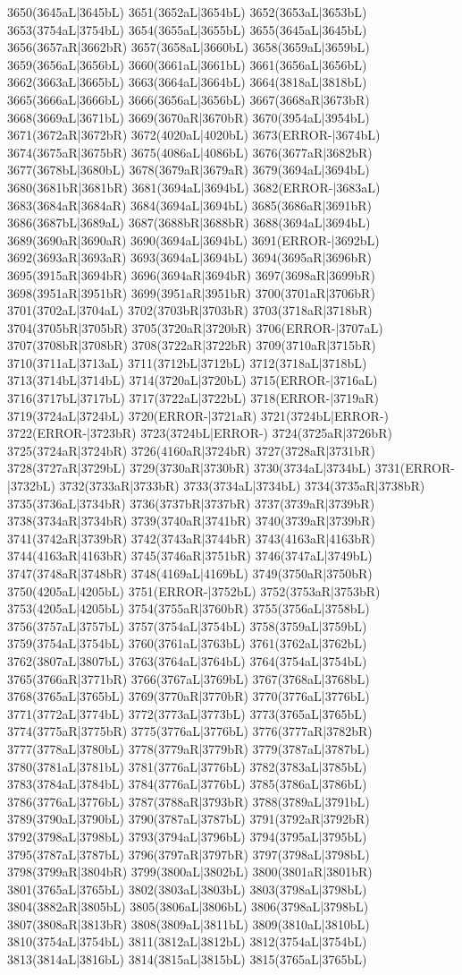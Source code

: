 3650(3645aL|3645bL) 3651(3652aL|3654bL) 3652(3653aL|3653bL) 3653(3754aL|3754bL) 3654(3655aL|3655bL) 3655(3645aL|3645bL) 3656(3657aR|3662bR) 3657(3658aL|3660bL) 3658(3659aL|3659bL) 3659(3656aL|3656bL) 3660(3661aL|3661bL) 3661(3656aL|3656bL) 3662(3663aL|3665bL) 3663(3664aL|3664bL) 3664(3818aL|3818bL) 3665(3666aL|3666bL) 3666(3656aL|3656bL) 3667(3668aR|3673bR) 3668(3669aL|3671bL) 3669(3670aR|3670bR) 3670(3954aL|3954bL) 3671(3672aR|3672bR) 3672(4020aL|4020bL) 3673(ERROR-|3674bL) 3674(3675aR|3675bR) 3675(4086aL|4086bL) 3676(3677aR|3682bR) 3677(3678bL|3680bL) 3678(3679aR|3679aR) 3679(3694aL|3694bL) 3680(3681bR|3681bR) 3681(3694aL|3694bL) 3682(ERROR-|3683aL) 3683(3684aR|3684aR) 3684(3694aL|3694bL) 3685(3686aR|3691bR) 3686(3687bL|3689aL) 3687(3688bR|3688bR) 3688(3694aL|3694bL) 3689(3690aR|3690aR) 3690(3694aL|3694bL) 3691(ERROR-|3692bL) 3692(3693aR|3693aR) 3693(3694aL|3694bL) 3694(3695aR|3696bR) 3695(3915aR|3694bR) 3696(3694aR|3694bR) 3697(3698aR|3699bR) 3698(3951aR|3951bR) 3699(3951aR|3951bR) 3700(3701aR|3706bR) 3701(3702aL|3704aL) 3702(3703bR|3703bR) 3703(3718aR|3718bR) 3704(3705bR|3705bR) 3705(3720aR|3720bR) 3706(ERROR-|3707aL) 3707(3708bR|3708bR) 3708(3722aR|3722bR) 3709(3710aR|3715bR) 3710(3711aL|3713aL) 3711(3712bL|3712bL) 3712(3718aL|3718bL) 3713(3714bL|3714bL) 3714(3720aL|3720bL) 3715(ERROR-|3716aL) 3716(3717bL|3717bL) 3717(3722aL|3722bL) 3718(ERROR-|3719aR) 3719(3724aL|3724bL) 3720(ERROR-|3721aR) 3721(3724bL|ERROR-) 3722(ERROR-|3723bR) 3723(3724bL|ERROR-) 3724(3725aR|3726bR) 3725(3724aR|3724bR) 3726(4160aR|3724bR) 3727(3728aR|3731bR) 3728(3727aR|3729bL) 3729(3730aR|3730bR) 3730(3734aL|3734bL) 3731(ERROR-|3732bL) 3732(3733aR|3733bR) 3733(3734aL|3734bL) 3734(3735aR|3738bR) 3735(3736aL|3734bR) 3736(3737bR|3737bR) 3737(3739aR|3739bR) 3738(3734aR|3734bR) 3739(3740aR|3741bR) 3740(3739aR|3739bR) 3741(3742aR|3739bR) 3742(3743aR|3744bR) 3743(4163aR|4163bR) 3744(4163aR|4163bR) 3745(3746aR|3751bR) 3746(3747aL|3749bL) 3747(3748aR|3748bR) 3748(4169aL|4169bL) 3749(3750aR|3750bR) 3750(4205aL|4205bL) 3751(ERROR-|3752bL) 3752(3753aR|3753bR) 3753(4205aL|4205bL) 3754(3755aR|3760bR) 3755(3756aL|3758bL) 3756(3757aL|3757bL) 3757(3754aL|3754bL) 3758(3759aL|3759bL) 3759(3754aL|3754bL) 3760(3761aL|3763bL) 3761(3762aL|3762bL) 3762(3807aL|3807bL) 3763(3764aL|3764bL) 3764(3754aL|3754bL) 3765(3766aR|3771bR) 3766(3767aL|3769bL) 3767(3768aL|3768bL) 3768(3765aL|3765bL) 3769(3770aR|3770bR) 3770(3776aL|3776bL) 3771(3772aL|3774bL) 3772(3773aL|3773bL) 3773(3765aL|3765bL) 3774(3775aR|3775bR) 3775(3776aL|3776bL) 3776(3777aR|3782bR) 3777(3778aL|3780bL) 3778(3779aR|3779bR) 3779(3787aL|3787bL) 3780(3781aL|3781bL) 3781(3776aL|3776bL) 3782(3783aL|3785bL) 3783(3784aL|3784bL) 3784(3776aL|3776bL) 3785(3786aL|3786bL) 3786(3776aL|3776bL) 3787(3788aR|3793bR) 3788(3789aL|3791bL) 3789(3790aL|3790bL) 3790(3787aL|3787bL) 3791(3792aR|3792bR) 3792(3798aL|3798bL) 3793(3794aL|3796bL) 3794(3795aL|3795bL) 3795(3787aL|3787bL) 3796(3797aR|3797bR) 3797(3798aL|3798bL) 3798(3799aR|3804bR) 3799(3800aL|3802bL) 3800(3801aR|3801bR) 3801(3765aL|3765bL) 3802(3803aL|3803bL) 3803(3798aL|3798bL) 3804(3882aR|3805bL) 3805(3806aL|3806bL) 3806(3798aL|3798bL) 3807(3808aR|3813bR) 3808(3809aL|3811bL) 3809(3810aL|3810bL) 3810(3754aL|3754bL) 3811(3812aL|3812bL) 3812(3754aL|3754bL) 3813(3814aL|3816bL) 3814(3815aL|3815bL) 3815(3765aL|3765bL) 